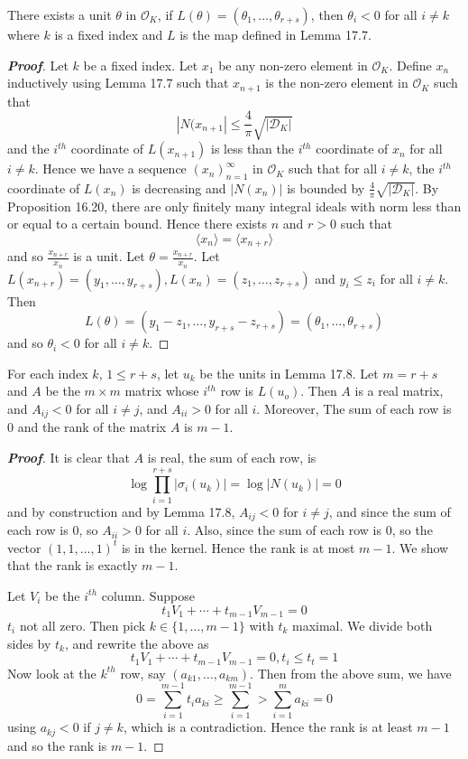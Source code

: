 \begin{lemma} There exists a unit $\theta$ in $\mathcal{O}_K$, if $L(\theta)=(\theta_1,\ldots,\theta_{r+s})$, then
$\theta_i <0$ for all $i \neq k$ where $k$ is a fixed index and $L$ is the map defined in Lemma 17.7.
\end{lemma}
\begin{proof}[\bf Proof] Let $k$ be a fixed index.
Let $x_1$ be any non-zero element in $\mathcal{O}_K$. Define $x_n$ inductively using Lemma 17.7 such that
$x_{n+1}$ is the non-zero element in $\mathcal{O}_K$ such that
$$|N(x_{n+1}| \le \frac{4}{\pi}\sqrt{|\mathcal{D}_K|}$$
and the $i^{th}$ coordinate of $L(x_{n+1})$ is less than the $i^{th}$ coordinate of $x_n$ for all $i \neq k$.
Hence we have a sequence $(x_n)_{n=1}^\infty$ in $\mathcal{O}_K$ such that for all $i \neq k$, the $i^{th}$ coordinate of $L(x_n)$ is decreasing and
$|N(x_n)|$ is bounded by $\frac{4}{\pi}\sqrt{|\mathcal{D}_K|}$. By Proposition 16.20, there are only finitely many
integral ideals with norm less than or equal to a certain bound. Hence there exists $n$ and $r>0$ such that
$$\langle x_n \rangle=\langle x_{n+r} \rangle$$
and so $\frac{x_{n+r}}{x_n}$ is a unit. Let $\theta=\frac{x_{n+r}}{x_n}$.
Let $L(x_{n+r})=(y_1,\ldots,y_{r+s}),L(x_n)=(z_1,\ldots,z_{r+s})$ and $y_i \le z_i$ for all $i \neq k$.
Then
$$L(\theta)=(y_1-z_1,\ldots,y_{r+s}-z_{r+s})=(\theta_1,\ldots,\theta_{r+s})$$
and so $\theta_i<0$ for all $i \neq k$.
\end{proof}
\begin{lemma} For each index $k$, $1\le r+s$, let $u_k$ be the units in Lemma 17.8. Let $m=r+s$ and $A$ be the
$m \times m$ matrix whose $i^{th}$ row is $L(u_o)$. Then $A$ is a real matrix, and $A_{ij}<0$ for all $i \neq j$,
and $A_{ii}>0$ for all $i$. Moreover, The sum of each row is $0$ and the rank of the matrix $A$ is $m-1$.
\end{lemma}
\begin{proof}[\bf Proof] It is clear that $A$ is real, the sum of each row, is
$$\log{\prod_{i=1}^{r+s}|\sigma_i(u_k)|}=\log{|N(u_k)|}=0$$
and by construction and by Lemma 17.8, $A_{ij}<0$ for $i \neq j$, and since the sum of each row is $0$, so
$A_{ii}>0$ for all $i$. Also, since the sum of each row is $0$, so the vector
$(1,1,\ldots,1)^t$ is in the kernel. Hence the rank is at most $m-1$. We show that the rank is exactly $m-1$.

Let $V_i$ be the $i^{th}$ column. Suppose
$$t_1V_1+\cdots+t_{m-1}V_{m-1}=0$$
$t_i$ not all zero. Then pick $k \in \{1,\ldots,m-1\}$ with $t_k$ maximal. We divide both sides by $t_k$, and
rewrite the above as
$$t_1V_1+\cdots+t_{m-1}V_{m-1}=0, t_i \le t_t=1$$
Now look at the $k^{th}$ row, say $(a_{k1},\ldots,a_{km})$. Then from the above sum, we have
$$0=\sum_{i=1}^{m-1}t_i a_{ki} \ge \sum_{i=1}^{m-1}>\sum_{i=1}^m a_{ki}=0$$
using $a_{kj}<0$ if $j \neq k$, which is a contradiction.
Hence the rank is at least $m-1$ and so the rank is $m-1$.
\end{proof}
